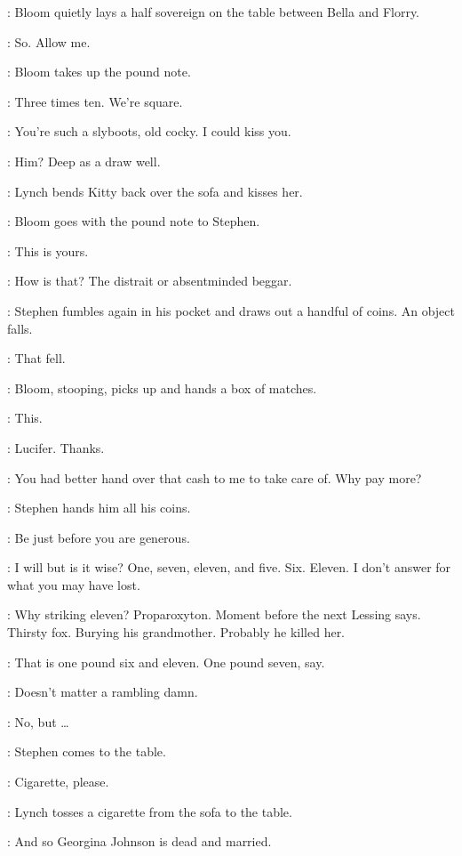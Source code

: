 :
Bloom quietly lays a half sovereign on the table between Bella and Florry.

\Bloom:
So. Allow me.

:
Bloom takes up the pound note.

\Bloom:
Three times ten.
We're square.

\Bella:
You're such a slyboots, old cocky.
I could kiss you.

\Zoe:
Him?
Deep as a draw well.

:
Lynch bends Kitty back over the sofa and kisses her.

:
Bloom goes with the pound note to Stephen.

\Bloom:
This is yours.

\Stephen:
How is that?
The distrait or absentminded beggar.

:
Stephen fumbles again in his pocket and draws out a handful of coins.
An object falls.

\Stephen:
That fell.

:
Bloom, stooping, picks up and hands a box of matches.

\Bloom:
This.

\Stephen:
Lucifer.
Thanks.

\Bloom:
You had better hand over that cash to me to take care of.
Why pay more?

:
Stephen hands him all his coins.

\Stephen:
Be just before you are generous.

\Bloom:
I will but is it wise?
One, seven, eleven, and five.
Six. Eleven.
I don't answer for what you may have lost.

\Stephen:
Why striking eleven?
Proparoxyton.
Moment before the next Lessing says.
Thirsty fox.
Burying his grandmother.
Probably he killed her.

\Bloom:
That is one pound six and eleven.
One pound seven, say.

\Stephen:
Doesn't matter a rambling damn.

\Bloom:
No, but \ldots

:
Stephen comes to the table.

\Stephen:
Cigarette, please.

:
Lynch tosses a cigarette from the sofa to the table.

\Stephen:
And so Georgina Johnson is dead and married.

